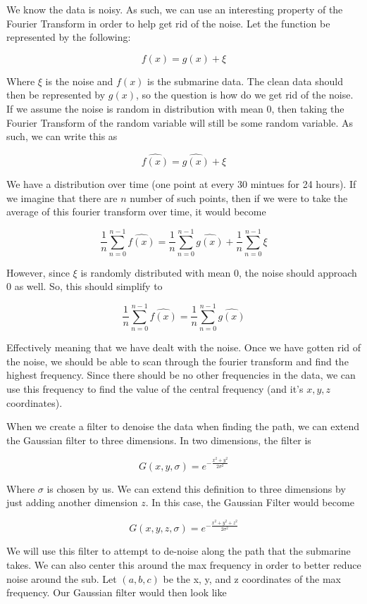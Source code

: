 \documentclass[11pt]{amsart}
\begin{document}
We know the data is noisy. As such, we can use an interesting property of the Fourier Transform in order
to help get rid of the noise. Let the function be represented by the following: 

\[f(x) = g(x) + \xi\]

Where $\xi$ is the noise and $f(x)$ is the submarine data. The clean data should then be represented
by $g(x)$, so the question is how do we get rid of the noise. If we assume the noise is random 
in distribution with mean 0, then taking the Fourier Transform of the random variable will still be some random variable.
As such, we can write this as 

\[\hat{f(x)} = \hat{g(x)} + \xi\]

We have a distribution over time (one point at every 30 mintues for 24 hours). If we imagine that there are
$n$ number of such points, then if we were to take the average of this fourier transform over time, it
would become 

\[\frac{1}{n}\sum_{n=0}^{n-1}\hat{f(x)} = \frac{1}{n}\sum_{n=0}^{n-1}\hat{g(x)} + \frac{1}{n}\sum_{n=0}^{n-1}\xi\]

However, since $\xi$ is randomly distributed with mean 0, the noise should approach 0 as well. So,
this should simplify to 

\[\frac{1}{n}\sum_{n=0}^{n-1}\hat{f(x)} = \frac{1}{n}\sum_{n=0}^{n-1}\hat{g(x)}\]

Effectively meaning that we have dealt with the noise.
Once we have gotten rid of the noise, we should be able to scan through the fourier transform 
and find the highest frequency. Since there should be no other frequencies in the data, we can 
use this frequency to find the value of the central frequency (and it's $x, y, z$ coordinates). 

When we create a filter to denoise the data when finding the path, we can extend the Gaussian filter
to three dimensions. In two dimensions, the filter is 

\[G(x, y, \sigma) = e^{-\frac{x^2 + y^2}{2\sigma^2}}\]

Where $\sigma$ is chosen by us. We can extend this definition to three dimensions by just adding another
dimension $z$. In this case, the Gaussian Filter would become 

\[G(x, y, z, \sigma) = e^{-\frac{x^2 + y^2 + z^2}{2\sigma^2}}\]

We will use this filter to attempt to de-noise along the path that the submarine takes. We can also center 
this around the max frequency in order to better reduce noise around the sub. Let $(a, b, c)$
be the x, y, and z coordinates of the max frequency. Our Gaussian filter would then look like 
\end{document}

